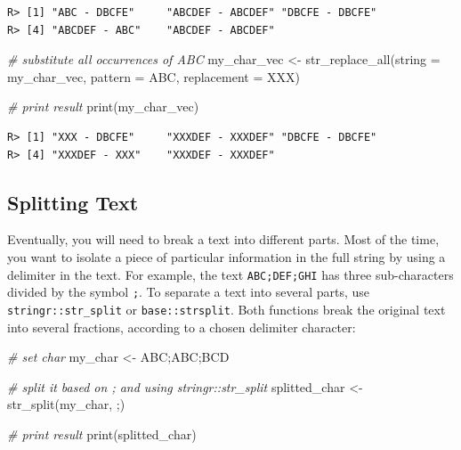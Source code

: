 \documentclass[
  12pt,
]{book}
\newenvironment{Shaded}{\begin{snugshade}}{\end{snugshade}}
\newcommand{\AttributeTok}[1]{\textcolor[rgb]{0.61,0.61,0.61}{#1}}
\newcommand{\CommentTok}[1]{\textcolor[rgb]{0.37,0.37,0.37}{\textit{#1}}}
\newcommand{\FunctionTok}[1]{\textcolor[rgb]{0,0,0}{#1}}
\newcommand{\NormalTok}[1]{#1}
\newcommand{\OtherTok}[1]{\textcolor[rgb]{0.37,0.37,0.37}{#1}}
\newcommand{\StringTok}[1]{\textcolor[rgb]{0.5,0.5,0.5}{#1}}
\begin{document}
\begin{verbatim}
R> [1] "ABC - DBCFE"     "ABCDEF - ABCDEF" "DBCFE - DBCFE"  
R> [4] "ABCDEF - ABC"    "ABCDEF - ABCDEF"
\end{verbatim}

\begin{Shaded}
\begin{Highlighting}[]
\CommentTok{\# substitute all occurrences of \textquotesingle{}ABC\textquotesingle{}}
\NormalTok{my\_char\_vec }\OtherTok{\textless{}{-}} \FunctionTok{str\_replace\_all}\NormalTok{(}\AttributeTok{string =}\NormalTok{ my\_char\_vec,}
                               \AttributeTok{pattern =} \StringTok{\textquotesingle{}ABC\textquotesingle{}}\NormalTok{,}
                               \AttributeTok{replacement =} \StringTok{\textquotesingle{}XXX\textquotesingle{}}\NormalTok{)}

\CommentTok{\# print result}
\FunctionTok{print}\NormalTok{(my\_char\_vec)}
\end{Highlighting}
\end{Shaded}

\begin{verbatim}
R> [1] "XXX - DBCFE"     "XXXDEF - XXXDEF" "DBCFE - DBCFE"  
R> [4] "XXXDEF - XXX"    "XXXDEF - XXXDEF"
\end{verbatim}

\hypertarget{splitting-text}{%
\subsection{Splitting Text}\label{splitting-text}}

Eventually, you will need to break a text into different parts. Most of the time, you want to isolate a piece of particular information in the full string by using a delimiter in the text. For example, the text \texttt{\textquotesingle{}ABC;DEF;GHI\textquotesingle{}} has three sub-characters divided by the symbol \texttt{;}. To separate a text into several parts, use \texttt{stringr::str\_split} or \texttt{base::strsplit}. Both functions break the original text into several fractions, according to a chosen delimiter character:  

\begin{Shaded}
\begin{Highlighting}[]
\CommentTok{\# set char}
\NormalTok{my\_char }\OtherTok{\textless{}{-}} \StringTok{\textquotesingle{}ABC;ABC;BCD\textquotesingle{}}

\CommentTok{\# split it based on \textquotesingle{};\textquotesingle{} and using stringr::str\_split}
\NormalTok{splitted\_char }\OtherTok{\textless{}{-}} \FunctionTok{str\_split}\NormalTok{(my\_char, }\StringTok{\textquotesingle{};\textquotesingle{}}\NormalTok{)}

\CommentTok{\# print result}
\FunctionTok{print}\NormalTok{(splitted\_char)}
\end{Highlighting}
\end{Shaded}
\end{document}
